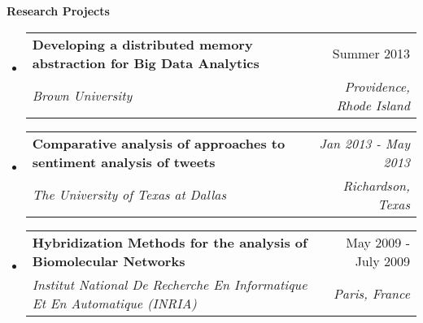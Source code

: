 \documentclass[letterpaper,11pt]{article}
\makeatletter
\newcommand{\resitem}[1]{\item[\ding{226}] #1 \vspace{-2pt}}
\newcommand{\resheading}[1]{{\large \colorbox{mygrey}{\begin{minipage}{\textwidth}{\textbf{#1 \vphantom{p\^{E}}}}\end{minipage}}}}
\newcommand{\ressubheading}[4]{
\begin{tabular*}{7.0in}{l@{\extracolsep{\fill}}r}
		\textbf{#1} & #2 \\
		\textit{#3} & \textit{#4} \\
\end{tabular*}\vspace{-6pt}}
\newcommand{\reslineheading}[2]{
\begin{tabular*}{7.0in}{l@{\extracolsep{\fill}}r}
		\textbf{#1} & #2 \\
\end{tabular*}\vspace{-6pt}}
\makeatother
\begin{document}
\resheading{Research Projects}
\begin{itemize}

\item
	\ressubheading{Developing a distributed memory abstraction for Big Data Analytics}{Summer 2013}{Brown University}{Providence, Rhode Island}

\item
	\ressubheading{Comparative analysis of approaches to sentiment analysis of tweets}{\textit{Jan 2013 - May 2013}}{The University of Texas at Dallas}{Richardson, Texas}

\item
	\ressubheading{Hybridization Methods for the analysis of Biomolecular Networks}{May 2009 - July 2009}{Institut National De Recherche En Informatique Et En Automatique (INRIA)}{Paris, France}
%

\end{itemize}
\end{document}
